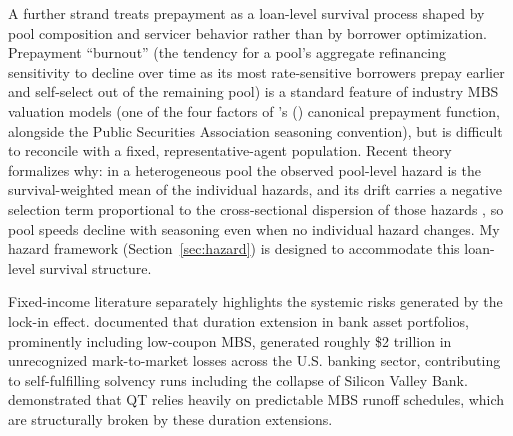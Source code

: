 \documentclass[12pt]{article}
\newcommand{\citepos}[1]{\citeauthor{#1}'s (\citeyear{#1})}
\begin{document}
A further strand treats prepayment as a loan-level survival process shaped by pool composition and servicer behavior rather than by borrower optimization. Prepayment ``burnout'' (the tendency for a pool's aggregate refinancing sensitivity to decline over time as its most rate-sensitive borrowers prepay earlier and self-select out of the remaining pool) is a standard feature of industry MBS valuation models (one of the four factors of \citepos{richard1989} canonical prepayment function, alongside the Public Securities Association seasoning convention), but is difficult to reconcile with a fixed, representative-agent population. Recent theory formalizes why: in a heterogeneous pool the observed pool-level hazard is the survival-weighted mean of the individual hazards, and its drift carries a negative selection term proportional to the cross-sectional dispersion of those hazards \citep[arXiv preprint]{lesniewski2026}, so pool speeds decline with seasoning even when no individual hazard changes. My hazard framework (Section~\ref{sec:hazard}) is designed to accommodate this loan-level survival structure.

Fixed-income literature separately highlights the systemic risks generated by the lock-in effect. \citet{jiang2023} documented that duration extension in bank asset portfolios, prominently including low-coupon MBS, generated roughly \$2 trillion in unrecognized mark-to-market losses across the U.S. banking sector, contributing to self-fulfilling solvency runs including the collapse of Silicon Valley Bank. \citet{smith2023} demonstrated that QT relies heavily on predictable MBS runoff schedules, which are structurally broken by these duration extensions.
\end{document}
